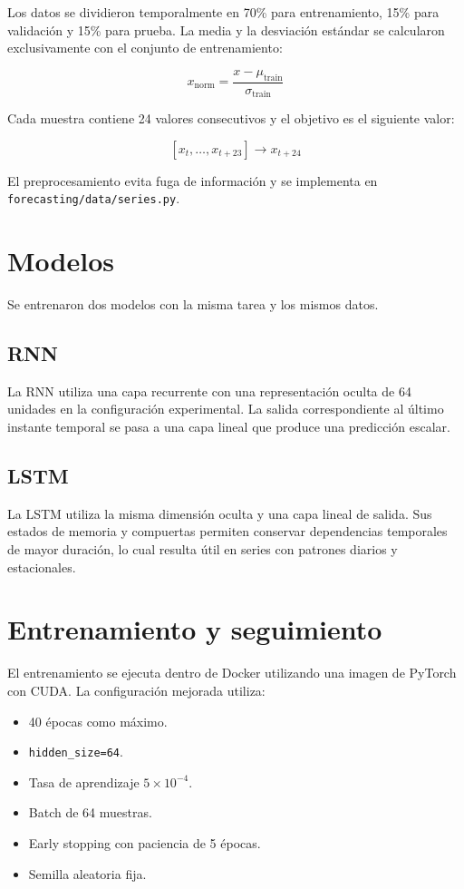 \documentclass[conference]{IEEEtran}
\begin{document}
Los datos se dividieron temporalmente en 70\% para entrenamiento, 15\% para
validación y 15\% para prueba. La media y la desviación estándar se
calcularon exclusivamente con el conjunto de entrenamiento:

\[
x_{\mathrm{norm}} = \frac{x-\mu_{\mathrm{train}}}
                         {\sigma_{\mathrm{train}}}
\]

Cada muestra contiene 24 valores consecutivos y el objetivo es el siguiente
valor:

\[
[x_t,\ldots,x_{t+23}] \longrightarrow x_{t+24}
\]

El preprocesamiento evita fuga de información y se implementa en
\texttt{forecasting/data/series.py}.

\section{Modelos}

Se entrenaron dos modelos con la misma tarea y los mismos datos.

\subsection{RNN}

La RNN utiliza una capa recurrente con una representación oculta de 64
unidades en la configuración experimental. La salida correspondiente al
último instante temporal se pasa a una capa lineal que produce una
predicción escalar.

\subsection{LSTM}

La LSTM utiliza la misma dimensión oculta y una capa lineal de salida. Sus
estados de memoria y compuertas permiten conservar dependencias temporales
de mayor duración, lo cual resulta útil en series con patrones diarios y
estacionales.

\section{Entrenamiento y seguimiento}

El entrenamiento se ejecuta dentro de Docker utilizando una imagen de
PyTorch con CUDA. La configuración mejorada utiliza:

\begin{itemize}
    \item 40 épocas como máximo.
    \item \texttt{hidden\_size=64}.
    \item Tasa de aprendizaje $5\times10^{-4}$.
    \item Batch de 64 muestras.
    \item Early stopping con paciencia de 5 épocas.
    \item Semilla aleatoria fija.
\end{itemize}
\end{document}
